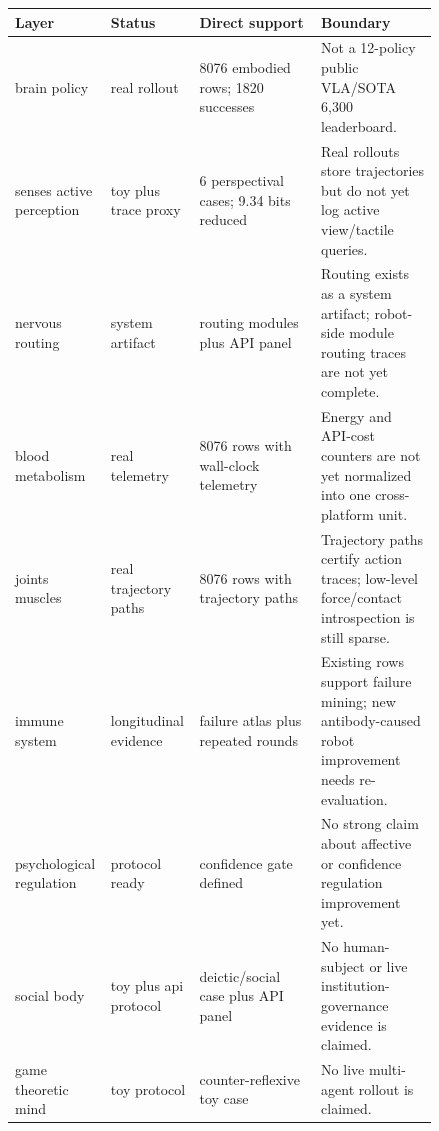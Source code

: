 \begin{tabular}{p{0.15\linewidth}p{0.14\linewidth}p{0.28\linewidth}p{0.27\linewidth}}
\toprule
Layer & Status & Direct support & Boundary \\
\midrule
brain policy & real rollout & 8076 embodied rows; 1820 successes & Not a 12-policy public VLA/SOTA 6,300 leaderboard. \\
senses active perception & toy plus trace proxy & 6 perspectival cases; 9.34 bits reduced & Real rollouts store trajectories but do not yet log active view/tactile queries. \\
nervous routing & system artifact & routing modules plus API panel & Routing exists as a system artifact; robot-side module routing traces are not yet complete. \\
blood metabolism & real telemetry & 8076 rows with wall-clock telemetry & Energy and API-cost counters are not yet normalized into one cross-platform unit. \\
joints muscles & real trajectory paths & 8076 rows with trajectory paths & Trajectory paths certify action traces; low-level force/contact introspection is still sparse. \\
immune system & longitudinal evidence & failure atlas plus repeated rounds & Existing rows support failure mining; new antibody-caused robot improvement needs re-evaluation. \\
psychological regulation & protocol ready & confidence gate defined & No strong claim about affective or confidence regulation improvement yet. \\
social body & toy plus api protocol & deictic/social case plus API panel & No human-subject or live institution-governance evidence is claimed. \\
game theoretic mind & toy protocol & counter-reflexive toy case & No live multi-agent rollout is claimed. \\
\bottomrule
\end{tabular}
